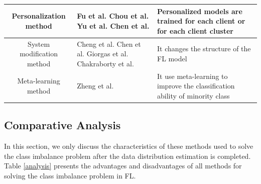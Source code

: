 \documentclass[10pt,journal,compsoc]{IEEEtran}
\begin{document}
\begin{table}[!t]
\begin{tabular}{cp{5.5cm}p{6cm}}
			Personalization method&Fu et al. \cite{fu2021cic} Chou et al. \cite{chou2022grp} Yu et al. \cite{yu2020learning} Chen et al. \cite{chen2022personalized}&Personalized models are trained for each client or for each client cluster\\ \hline
			System modification method& Cheng et al. \cite{cheng2022blockchain} \cite{cheng2022class} Chen et al. \cite{chen2021novel} Giorgas et al. \cite{giorgas2020online} Chakraborty et al.\cite{chakraborty2022improving} &It changes the structure of the FL model \\ \hline
			Meta-learning method&Zheng et al. \cite{zheng2021federated}&It use meta-learning to improve the classification ability of minority class \\ 
			\hline
		\end{tabular}
	\end{table}
	
	\subsection{Comparative Analysis}
	In this section, we only discuss the characteristics of these methods used to solve the class imbalance problem after the data distribution estimation is completed. Table \ref{analysis} presents the advantages and disadvantages of all methods for solving the class imbalance problem in FL.
	
\end{document}
